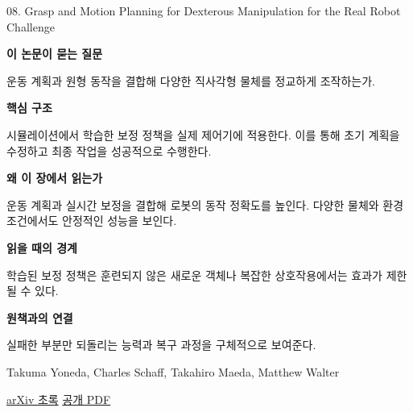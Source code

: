 \documentclass[11pt,openany]{book}
\begin{document}
\begin{termcard}{08. Grasp and Motion Planning for Dexterous Manipulation for the Real Robot Challenge}

\par

\medskip

{\sffamily\bfseries\color{deepblue} 이 논문이 묻는 질문}\par

운동 계획과 원형 동작을 결합해 다양한 직사각형 물체를 정교하게 조작하는가.

\smallskip

{\sffamily\bfseries\color{deepblue} 핵심 구조}\par

시뮬레이션에서 학습한 보정 정책을 실제 제어기에 적용한다. 이를 통해 초기 계획을 수정하고 최종 작업을 성공적으로 수행한다.

\smallskip

{\sffamily\bfseries\color{deepblue} 왜 이 장에서 읽는가}\par

운동 계획과 실시간 보정을 결합해 로봇의 동작 정확도를 높인다. 다양한 물체와 환경 조건에서도 안정적인 성능을 보인다.

\smallskip

{\sffamily\bfseries\color{coral} 읽을 때의 경계}\par

학습된 보정 정책은 훈련되지 않은 새로운 객체나 복잡한 상호작용에서는 효과가 제한될 수 있다.

\smallskip

{\sffamily\bfseries\color{teal} 원책과의 연결}\par

실패한 부분만 되돌리는 능력과 복구 과정을 구체적으로 보여준다.

\medskip

{\footnotesize\color{muted} Takuma Yoneda, Charles Schaff, Takahiro Maeda, Matthew Walter\par

\href{https://arxiv.org/abs/2101.02842}{arXiv 초록} \quad \href{https://arxiv.org/pdf/2101.02842}{공개 PDF}\par}

\end{termcard}
\end{document}
